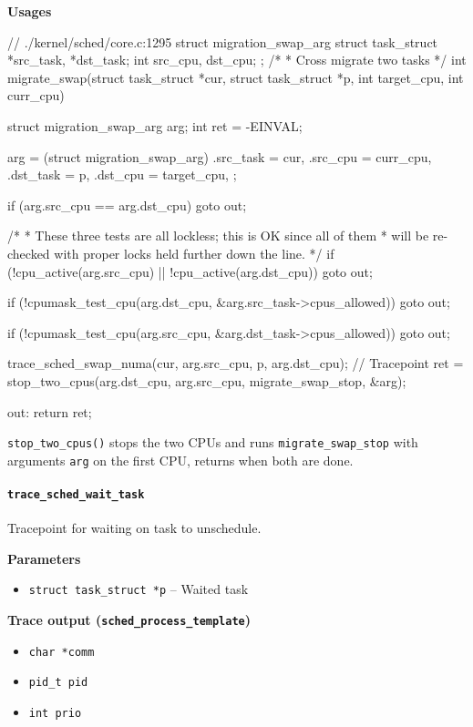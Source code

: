 \textbf{Usages}
\begin{code}
// ./kernel/sched/core.c:1295
struct migration_swap_arg {
	struct task_struct *src_task, *dst_task;
	int src_cpu, dst_cpu;
};
/*
 * Cross migrate two tasks
 */
int migrate_swap(struct task_struct *cur, struct task_struct *p,
		int target_cpu, int curr_cpu){
	struct migration_swap_arg arg;
	int ret = -EINVAL;

	arg = (struct migration_swap_arg){
		.src_task = cur,
		.src_cpu = curr_cpu,
		.dst_task = p,
		.dst_cpu = target_cpu,
	};

	if (arg.src_cpu == arg.dst_cpu)
		goto out;

	/*
	 * These three tests are all lockless; this is OK since all of them
	 * will be re-checked with proper locks held further down the line.
	 */
	if (!cpu_active(arg.src_cpu) || !cpu_active(arg.dst_cpu))
		goto out;

	if (!cpumask_test_cpu(arg.dst_cpu, &arg.src_task->cpus_allowed))
		goto out;

	if (!cpumask_test_cpu(arg.src_cpu, &arg.dst_task->cpus_allowed))
		goto out;

	trace_sched_swap_numa(cur, arg.src_cpu, p, arg.dst_cpu); // Tracepoint
	ret = stop_two_cpus(arg.dst_cpu, arg.src_cpu, migrate_swap_stop, &arg);

out:
	return ret;
}
\end{code}
\verb|stop_two_cpus()| stops the two CPUs and runs \verb|migrate_swap_stop| with arguments \verb|arg| on the first CPU, returns when both are done.

\paragraph{\texttt{trace\_sched\_wait\_task}}
Tracepoint for waiting on task to unschedule.

\textbf{Parameters}
\begin{itemize}
    \item \verb|struct task_struct *p| -- Waited task
\end{itemize}

\textbf{Trace output (\texttt{sched\_process\_template})}
\begin{itemize}
    \item \verb|char *comm|
    \item \verb|pid_t pid|
    \item \verb|int prio|
\end{itemize}

